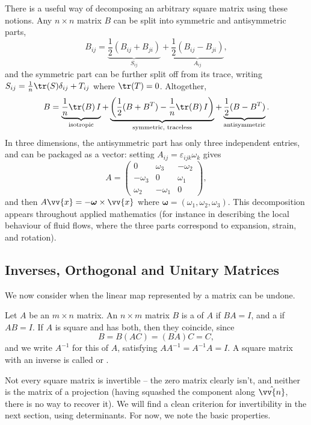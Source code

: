There is a useful way of decomposing an arbitrary square matrix using these notions.
Any $n \times n$ matrix $B$ can be split into symmetric and antisymmetric parts,
$$
B_{ij} = \underbrace{\frac{1}{2}\left(B_{ij} + B_{ji}\right)}_{S_{ij}} + \underbrace{\frac{1}{2}\left(B_{ij} - B_{ji}\right)}_{A_{ij}},
$$
and the symmetric part can be further split off from its trace, writing $S_{ij} = \frac{1}{n}\tr(S)\delta_{ij} + T_{ij}$ where $\tr(T) = 0$. Altogether,
$$
B = \underbrace{\frac{1}{n}\tr(B)\, I}_{\text{isotropic}} + \underbrace{\left(\frac{1}{2}(B + B^T) - \frac{1}{n}\tr(B)\, I\right)}_{\text{symmetric, traceless}} + \underbrace{\frac{1}{2}(B - B^T)}_{\text{antisymmetric}}.
$$
In three dimensions, the antisymmetric part has only three independent entries, and can be packaged as a vector: setting $A_{ij} = \varepsilon_{ijk}\omega_k$ gives
$$
A = \begin{pmatrix}
	0 & \omega_3 & -\omega_2 \\
	-\omega_3 & 0 & \omega_1 \\
	\omega_2 & - \omega_1 & 0
\end{pmatrix},
$$
and then $A \vv{x} = -\boldsymbol{\omega} \times \vv{x}$ where $\boldsymbol{\omega} = (\omega_1, \omega_2, \omega_3)$. This decomposition appears throughout applied mathematics (for instance in describing the local behaviour of fluid flows, where the three parts correspond to expansion, strain, and rotation).

\subsection{Inverses, Orthogonal and Unitary Matrices}

We now consider when the linear map represented by a matrix can be undone.

\begin{definition}[Inverse]
	Let $A$ be an $m \times n$ matrix. An $n \times m$ matrix $B$ is a  of $A$ if $BA = I$, and a  if $AB = I$. If $A$ is square and has both, then they coincide, since
	$$
	B = B(AC) = (BA)C = C,
	$$
	and we write $A^{-1}$ for this  of $A$, satisfying $A A^{-1} = A^{-1}A = I$. A square matrix with an inverse is called  or .
\end{definition}

Not every square matrix is invertible -- the zero matrix clearly isn't, and neither is the matrix of a projection (having squashed the component along $\hat{\vv{n}}$, there is no way to recover it). We will find a clean criterion for invertibility in the next section, using determinants. For now, we note the basic properties.

